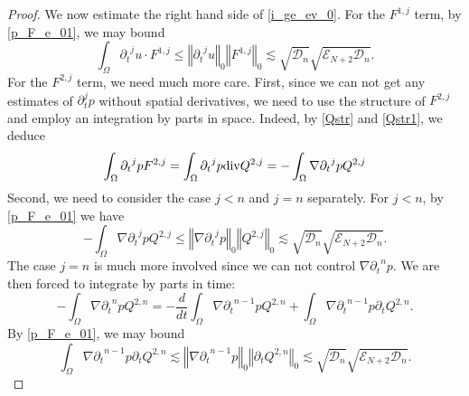 \documentclass[a4paper,reqno,11pt]{amsart}
\numberwithin{equation}{section}
\providecommand{\norm}[1]{\left\Vert#1\right\Vert}
\providecommand{\sd}[1]{\mathcal{D}_{#1}}
\providecommand{\se}[1]{\mathcal{E}_{#1}}
\providecommand{\norm}[1]{\left\Vert#1\right\Vert}
\begin{document}
\begin{proof}
We now estimate the right hand side of \eqref{i_ge_ev_0}. For the $F^{1,j}$ term, by \eqref{p_F_e_01}, we may bound
\begin{equation}
\int_\Omega  {\partial_t}^j u\cdot F^{1,j} \le   \norm{{\partial_t}^j u}_{0}   \norm{F^{1,j}}_0 {\lesssim}  \sqrt{\sd{n} } \sqrt{\se{N+2} \sd{n}}
 .
\end{equation}
For the $F^{2,j}$ term, we need much more care. First, since we can not get any estimates of $\partial_t^j p$ without spatial derivatives, we need to use the structure of $F^{2,j}$ and employ an integration by parts in space. Indeed, by \eqref{Qstr} and \eqref{Qstr1}, we deduce
\begin{equation}
\int_\Omega  {\partial_t}^j p  F^{2,j} =\int_\Omega  {\partial_t}^j p  {\rm div}Q^{2,j}
=-\int_\Omega  \nabla {\partial_t}^j p   Q^{2,j}
\end{equation}
Second, we need to consider the case $j< n$ and $j= n$ separately. For $j< n$, by \eqref{p_F_e_01} we have
\begin{equation}\label{i_te_4}
-\int_\Omega  \nabla {\partial_t}^j p  Q^{2,j}   \le   \norm{\nabla {\partial_t}^j p}_{0}   \norm{Q^{2,j} }_0 {\lesssim}  \sqrt{\sd{n}} \sqrt{\se{N+2} \sd{n}}.
\end{equation}
The case $j= n$ is much more involved since we can not control $\nabla{\partial_t}^{ n}p$. We are then forced to integrate by parts in time:
\begin{equation}
 -\int_\Omega   \nabla {\partial_t}^n p  Q^{2,n}= -\frac{d}{dt}\int_\Omega  \nabla {\partial_t}^{n-1} p  Q^{2,n}+\int_\Omega     \nabla {\partial_t}^{n-1} p {\partial_t} Q^{2,n}   .
\end{equation}
By \eqref{p_F_e_01}, we may bound
\begin{equation}\label{i_te_5}
 \int_\Omega  \nabla {\partial_t}^{n-1} p {\partial_t} Q^{2,n} {\lesssim}   \norm{\nabla {\partial_t}^{n-1} p }_{0} \norm{{\partial_t}   Q^{2,n}}_{0} {\lesssim}   \sqrt{\sd{n}} \sqrt{\se{N+2} \sd{n}} .
\end{equation}


\end{proof}
\end{document}
